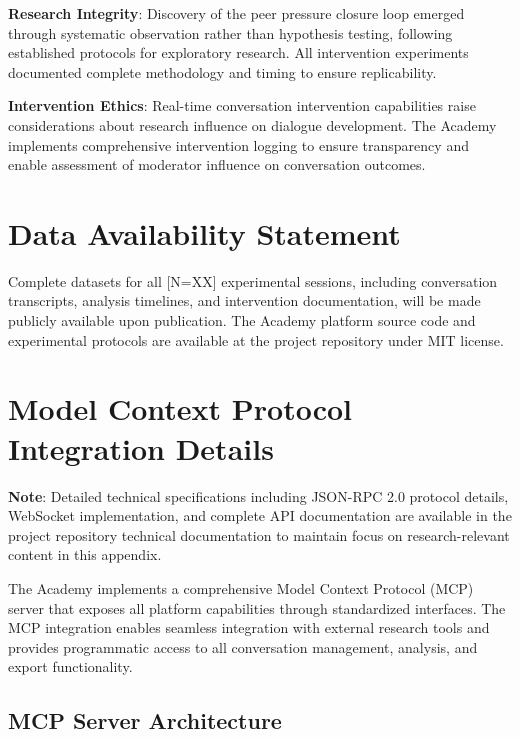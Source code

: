 \documentclass[11pt,letterpaper]{article}
\newcommand{\theacademy}{The Academy}
\newcommand{\totalSessions}{[N=XX]} %
\begin{document}
\textbf{Research Integrity}: Discovery of the peer pressure closure loop emerged through systematic observation rather than hypothesis testing, following established protocols for exploratory research. All intervention experiments documented complete methodology and timing to ensure replicability.

\textbf{Intervention Ethics}: Real-time conversation intervention capabilities raise considerations about research influence on dialogue development. \theacademy{} implements comprehensive intervention logging to ensure transparency and enable assessment of moderator influence on conversation outcomes.

\section*{Data Availability Statement}

Complete datasets for all \totalSessions{} experimental sessions, including conversation transcripts, analysis timelines, and intervention documentation, will be made publicly available upon publication. \theacademy{} platform source code and experimental protocols are available at the project repository under MIT license.




\appendix

\section{Model Context Protocol Integration Details}
\label{app:mcp}

\textbf{Note}: Detailed technical specifications including JSON-RPC 2.0 protocol details, WebSocket implementation, and complete API documentation are available in the project repository technical documentation to maintain focus on research-relevant content in this appendix.

\theacademy{} implements a comprehensive Model Context Protocol (MCP) server that exposes all platform capabilities through standardized interfaces. The MCP integration enables seamless integration with external research tools and provides programmatic access to all conversation management, analysis, and export functionality.

\subsection{MCP Server Architecture}
\end{document}
